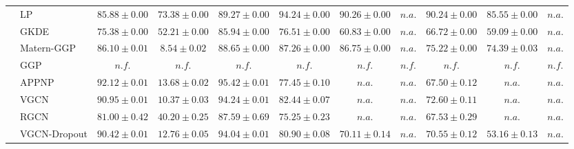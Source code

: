 \begin{table*}[!h]
{\begin{tabular}{ll|cc|cccc|ccc}
        \midrule
        
        & LP & ${85.88\scriptscriptstyle \pm 0.00}$ & ${73.38\scriptscriptstyle \pm 0.00}$ & ${89.27\scriptscriptstyle \pm 0.00}$ & ${\mathbf{94.24}\scriptscriptstyle \pm 0.00}$ & ${90.26\scriptscriptstyle \pm 0.00}$ & $n.a.$ & ${\mathbf{90.24}\scriptscriptstyle \pm 0.00}$ & ${85.55\scriptscriptstyle \pm 0.00}$ & $n.a.$\\
        & GKDE & ${75.38\scriptscriptstyle \pm 0.00}$ & ${52.21\scriptscriptstyle \pm 0.00}$ & ${85.94\scriptscriptstyle \pm 0.00}$ & ${76.51\scriptscriptstyle \pm 0.00}$ & ${60.83\scriptscriptstyle \pm 0.00}$ & $n.a.$ & ${66.72\scriptscriptstyle \pm 0.00}$ & ${59.09\scriptscriptstyle \pm 0.00}$ & $n.a.$\\
        & Matern-GGP & ${86.10\scriptscriptstyle \pm 0.01}$ & ${\mathbf{8.54}\scriptscriptstyle \pm 0.02}$ & ${88.65\scriptscriptstyle \pm 0.00}$ & ${87.26\scriptscriptstyle \pm 0.00}$ & ${86.75\scriptscriptstyle \pm 0.00}$ & $n.a.$ & ${75.22\scriptscriptstyle \pm 0.00}$ & ${74.39\scriptscriptstyle \pm 0.03}$ & $n.a.$\\
        & GGP & $n.f.$ & $n.f.$ & $n.f.$ & $n.f.$ & $n.f.$ & $n.f.$ & $n.f.$ & $n.f.$ & $n.f.$\\
        & APPNP & ${\mathbf{92.12}\scriptscriptstyle \pm 0.01}$ & ${13.68\scriptscriptstyle \pm 0.02}$ & ${\mathbf{95.42}\scriptscriptstyle \pm 0.01}$ & ${77.45\scriptscriptstyle \pm 0.10}$ & $n.a.$ & $n.a.$ & ${67.50\scriptscriptstyle \pm 0.12}$ & $n.a.$ & $n.a.$\\
        & VGCN & ${90.95\scriptscriptstyle \pm 0.01}$ & ${10.37\scriptscriptstyle \pm 0.03}$ & ${94.24\scriptscriptstyle \pm 0.01}$ & ${82.44\scriptscriptstyle \pm 0.07}$ & $n.a.$ & $n.a.$ & ${72.60\scriptscriptstyle \pm 0.11}$ & $n.a.$ & $n.a.$\\
        & RGCN & ${81.00\scriptscriptstyle \pm 0.42}$ & ${40.20\scriptscriptstyle \pm 0.25}$ & ${87.59\scriptscriptstyle \pm 0.69}$ & ${75.25\scriptscriptstyle \pm 0.23}$ & $n.a.$ & $n.a.$ & ${67.53\scriptscriptstyle \pm 0.29}$ & $n.a.$ & $n.a.$\\
        & VGCN-Dropout & ${90.42\scriptscriptstyle \pm 0.01}$ & ${12.76\scriptscriptstyle \pm 0.05}$ & ${94.04\scriptscriptstyle \pm 0.01}$ & ${80.90\scriptscriptstyle \pm 0.08}$ & ${70.11\scriptscriptstyle \pm 0.14}$ & $n.a.$ & ${70.55\scriptscriptstyle \pm 0.12}$ & ${53.16\scriptscriptstyle \pm 0.13}$ & $n.a.$\\

\end{tabular}}
\end{table*}
